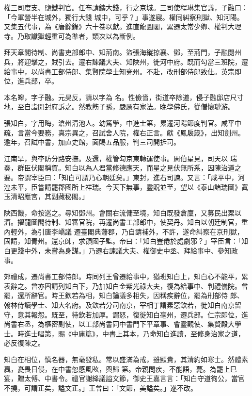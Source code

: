 \begin{pinyinscope}
 權三司度支、鹽鐵判官。任布請鑄大錢，行之京城。三司使程琳集官議，子融曰：「今軍營半在城外，獨行大錢
 城中，可乎？」事遂寢。權同糾察刑獄、知河陽。又集五代事，為《唐餘錄》六十卷以獻。進直龍圖閣，累遷太常少卿、權判大理寺。乃取讞獄輕重可為準者，類次以為斷例。



 拜天章閣待制、尚書吏部郎中、知荊南。盜張海縱掠襄、鄧，至荊門，子融閱州兵，將迎擊之，賊引去。遷右諫議大夫、知陜州，徙河中府。既而勾當三班院，遷給事中，以尚書工部侍郎、集賢院學士知兗州。不赴，改刑部侍郎致仕。英宗即位，進兵部，卒。



 本名皞，字子融。元昊反，請以字為
 名。性儉嗇，街道卒除道，侵子融邸店尺寸地，至自詣開封府訴之。然教飭子孫，嚴厲有家法。晚學佛氏，從僧懷璉游。



 張知白，字用晦，滄州清池人。幼篤學，中進士第，累遷河陽節度判官。咸平中疏，言當今要務，真宗異之，召試舍人院，權右正言。獻《鳳扆箴》，出知劍州。逾年，召試中書，加直史館，面賜五品服，判三司開拆司。



 江南旱，與李防分路安撫。及還，權管勾京東轉運使事。周伯星見，司天以
 瑞奏，群臣伏閣稱賀。知白以為人君當修德應天，而星之見伏無所系，因陳治道之要。帝謂宰臣曰：「知白可謂乃心朝廷矣。」東封，進右司諫。又言：「咸平中，河湟未平，臣嘗請罷郡國所上祥瑞。今天下無事，靈貺並至，望以《泰山諸瑞圖》寘玉清昭應宮，其副藏秘閣。」



 陜西饑，命按巡之。尋知鄧州。會關右流傭至境，知白既發倉廩，又募民出粟以濟。擢龍圖閣待制、知審官院，再遷尚書工部郎中，使契丹。知白以朝廷制官，重內輕外，為引唐李嶠議
 遷臺閣典藩郡，乃自請補外，不許，遂命糾察在京刑獄，固請，知青州。還京師，求領國子監。帝曰：「知白豈倦於處劇邪？」宰臣言：「知白更踐中外，未嘗為身謀。」乃遷右諫議大夫、權御史中丞、拜給事中、參知政事。



 郊禮成，遷尚書工部侍郎。時同列王曾遷給事中，猶班知白上，知白心不能平，累表辭之。曾亦固請列知白下，乃加知白金紫光祿大夫，復為給事中、判禮儀院。曾罷，還所辭官。時王欽若為相，知白論議多相失，因稱疾辭位，罷為刑部侍
 郎、翰林侍讀學士、知大名府。及欽若分司南京，宰相丁謂素惡欽若，徙知白南京留守，意其報怨。既至，待欽若加厚。謂怒，復徙知白亳州，遷兵部。仁宗即位，進尚書右丞，為樞密副使，以工部尚書同中書門下平章事、會靈觀使、集賢殿大學士。時進士唱第，賜《中庸篇》，中書上其本，乃命知白進讀，至修身治家之道，必反復陳之。



 知白在相位，慎名器，無毫發私。常以盛滿為戒，雖顯貴，其清約如寒士。然體素羸，憂畏日侵，在中書忽感風眩，輿歸
 第。帝親問疾，不能語，薨。為罷上巳宴，贈太傅、中書令。禮官謝絳議謚文節，御史王嘉言言：「知白守道徇公，當官不撓，可謂正矣，謚文正。」王曾曰：「文節，美謚矣。」遂不改。




\end{pinyinscope}

